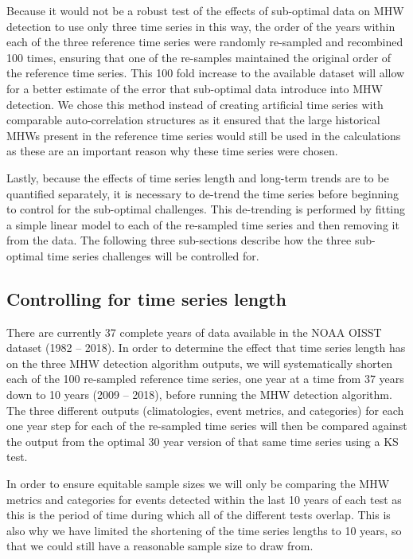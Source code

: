 \documentclass[]{article}
\begin{document}
Because it would not be a robust test of the effects of sub-optimal data
on MHW detection to use only three time series in this way, the order of
the years within each of the three reference time series were randomly
re-sampled and recombined 100 times, ensuring that one of the re-samples
maintained the original order of the reference time series. This 100
fold increase to the available dataset will allow for a better estimate
of the error that sub-optimal data introduce into MHW detection. We
chose this method instead of creating artificial time series with
comparable auto-correlation structures as it ensured that the large
historical MHWs present in the reference time series would still be used
in the calculations as these are an important reason why these time
series were chosen.

Lastly, because the effects of time series length and long-term trends
are to be quantified separately, it is necessary to de-trend the time
series before beginning to control for the sub-optimal challenges. This
de-trending is performed by fitting a simple linear model to each of the
re-sampled time series and then removing it from the data. The following
three sub-sections describe how the three sub-optimal time series
challenges will be controlled for.

\hypertarget{controlling-for-time-series-length}{%
\subsection{Controlling for time series
length}\label{controlling-for-time-series-length}}

There are currently 37 complete years of data available in the NOAA
OISST dataset (1982 -- 2018). In order to determine the effect that time
series length has on the three MHW detection algorithm outputs, we will
systematically shorten each of the 100 re-sampled reference time series,
one year at a time from 37 years down to 10 years (2009 -- 2018), before
running the MHW detection algorithm. The three different outputs
(climatologies, event metrics, and categories) for each one year step
for each of the re-sampled time series will then be compared against the
output from the optimal 30 year version of that same time series using a
KS test.

In order to ensure equitable sample sizes we will only be comparing the
MHW metrics and categories for events detected within the last 10 years
of each test as this is the period of time during which all of the
different tests overlap. This is also why we have limited the shortening
of the time series lengths to 10 years, so that we could still have a
reasonable sample size to draw from.
\end{document}
